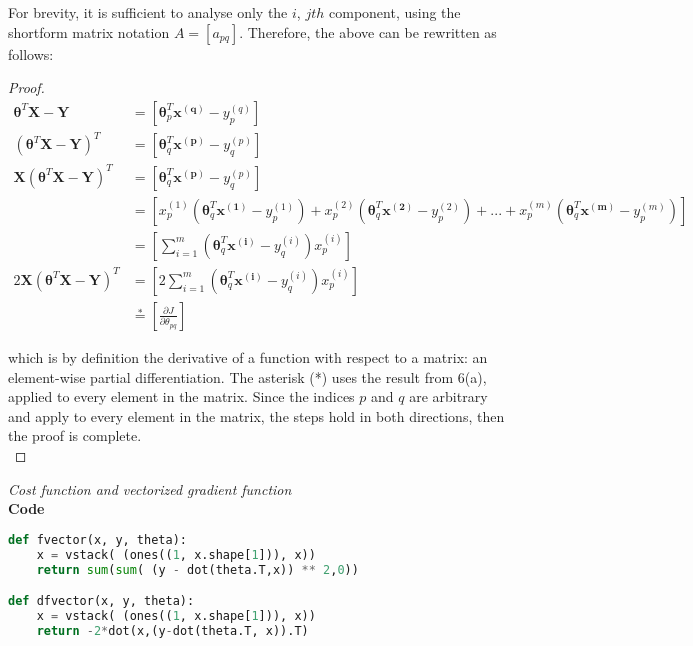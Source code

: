 \documentclass{article}
\begin{document}
For brevity, it is sufficient to analyse only the $i$, $jth$ component, using the shortform matrix notation $A=[a_{pq}]$. Therefore, the above can be rewritten as follows:
\begin{proof}
\begin{equation*}
\begin{split}
    \boldsymbol \theta^T \mathbf{X-Y}&=[ \boldsymbol \theta_p^T \mathbf{x^{(q)}}-y_p^{(q)}]\\
    (\boldsymbol \theta^T \mathbf{X-Y})^T&=[ \boldsymbol \theta_q^T \mathbf{x^{(p)}}-y_q^{(p)}]\\  
    \mathbf{X} (\boldsymbol \theta^T \mathbf{X-Y})^T&=[ \boldsymbol \theta_q^T \mathbf{x^{(p)}}-y_q^{(p)}]\\
    &=[x_p^{(1)}(\boldsymbol \theta_q^T \mathbf{x^{(1)}}-y_p^{(1)})+x_p^{(2)}(\boldsymbol \theta_q^T \mathbf{x^{(2)}}-y_p^{(2)})+...+x_p^{(m)}(\boldsymbol \theta_q^T \mathbf{x^{(m)}}-y_p^{(m)})]\\
    &=\left[\sum_{i=1}^m \left( \boldsymbol \theta_{q}^T \mathbf{x^{(i)}}-y_{q}^{(i)} \right) x_p^{(i)}\right]\\
    2 \mathbf{X} (\boldsymbol \theta^T \mathbf{X-Y})^T &=\left[2\sum_{i=1}^m \left( \boldsymbol \theta_{q}^T \mathbf{x^{(i)}}-y_{q}^{(i)} \right) x_p^{(i)}\right]\\
    &\stackrel{*}=\left[\frac{\partial J}{\partial \theta_{pq}}\right]
\end{split} 
\end{equation*}

which is by definition the derivative of a function with respect to a matrix: an element-wise partial differentiation. The asterisk (*) uses the result from 6(a), applied to every element in the matrix. Since the indices $p$ and $q$ are arbitrary and apply to every element in the matrix, the steps hold in both directions, then the proof is complete.\\ 
\end{proof}

\noindent \textit{Cost function and vectorized gradient function} 
\\
\textbf{Code}

\begin{lstlisting}[language=Python]
def fvector(x, y, theta):
    x = vstack( (ones((1, x.shape[1])), x))
    return sum(sum( (y - dot(theta.T,x)) ** 2,0))

def dfvector(x, y, theta):
    x = vstack( (ones((1, x.shape[1])), x))
    return -2*dot(x,(y-dot(theta.T, x)).T)
\end{lstlisting}
\end{document}
